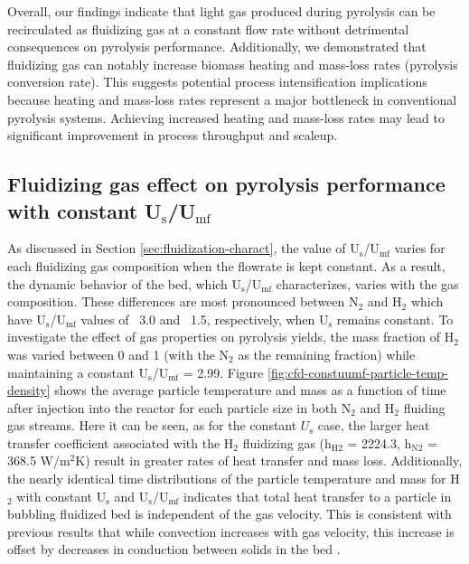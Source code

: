 Overall, our findings indicate that light gas produced during pyrolysis can be recirculated as fluidizing gas at a constant flow rate without detrimental consequences on pyrolysis performance. Additionally, we demonstrated that fluidizing gas can notably increase biomass heating and mass-loss rates (pyrolysis conversion rate). This suggests potential process intensification implications because heating and mass-loss rates represent a major bottleneck in conventional pyrolysis systems. Achieving increased heating and mass-loss rates may lead to significant improvement in process throughput and scaleup.

\subsection{Fluidizing gas effect on pyrolysis performance with constant \texorpdfstring{U$_\text{s}$/U$_\text{mf}$}{Us/Umf}}

As discussed in Section \ref{sec:fluidization-charact}, the value of U$_\text{s}$/U$_\text{mf}$ varies for each fluidizing gas composition when the flowrate is kept constant. As a result, the dynamic behavior of the bed, which U$_\text{s}$/U$_\text{mf}$ characterizes, varies with the gas composition. These differences are most pronounced between N$_2$ and H$_2$ which have U$_\text{s}$/U$_\text{mf}$ values of ~3.0 and ~1.5, respectively, when U$_\text{s}$ remains constant. To investigate the effect of gas properties on pyrolysis yields, the mass fraction of H$_2$ was varied between 0 and 1 (with the N$_2$ as the remaining fraction) while maintaining a constant U$_\text{s}$/U$_\text{mf}$ = 2.99. Figure \ref{fig:cfd-constuumf-particle-temp-density} shows the average particle temperature and mass as a function of time after injection into the reactor for each particle size in both N$_{2}$ and H$_{2}$ fluiding gas streams. Here it can be seen, as for the constant $U_\text{s}$ case, the larger heat transfer coefficient associated with the H$_2$ fluidizing gas (h$_\text{H2}$ = 2224.3, h$_\text{N2}$ = 368.5 W/m$^2$K) result in greater rates of heat transfer and mass loss. Additionally, the nearly identical time distributions of the particle temperature and mass for H$_2$ with constant U$_\text{s}$ and U$_\text{s}$/U$_\text{mf}$ indicates that total heat transfer to a particle in bubbling fluidized bed is independent of the gas velocity. This is consistent with previous results that while convection increases with gas velocity, this increase is offset by decreases in conduction between solids in the bed \cite{Collier-2004,zhou2009particle}.

